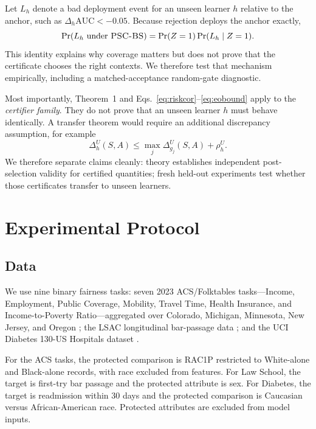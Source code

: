 \documentclass[10pt]{article}
\newcommand{\PSC}{\textsc{PSC-BS}}
\newcommand{\AUC}{\mathrm{AUC}}
\begin{document}
Let $L_h$ denote a bad deployment event for an unseen learner $h$ relative to the anchor, such as $\Delta_h\AUC<-0.05$.
Because rejection deploys the anchor exactly,
\begin{equation}
\Pr(L_h\text{ under }\PSC{})
=
\Pr(Z=1)\Pr(L_h\mid Z=1).
\label{eq:fallbackdecomp}
\end{equation}
This identity explains why coverage matters but does not prove that the certificate chooses the right contexts.
We therefore test that mechanism empirically, including a matched-acceptance random-gate diagnostic.

Most importantly, Theorem~1 and Eqs.~\eqref{eq:riskcor}--\eqref{eq:eobound} apply to the \emph{certifier family}.
They do not prove that an unseen learner $h$ must behave identically.
A transfer theorem would require an additional discrepancy assumption, for example
\begin{equation}
\Delta_h^U(S,A)
\le
\max_j \Delta_{g_j}^U(S,A)+\rho_h^U.
\end{equation}
We therefore separate claims cleanly: theory establishes independent post-selection validity for certified quantities; fresh held-out experiments test whether those certificates transfer to unseen learners.

\section{Experimental Protocol}

\subsection{Data}

We use nine binary fairness tasks:
seven 2023 ACS/Folktables tasks---Income, Employment, Public Coverage, Mobility, Travel Time, Health Insurance, and Income-to-Poverty Ratio---aggregated over Colorado, Michigan, Minnesota, New Jersey, and Oregon \citep{ding2021retiring};
the LSAC longitudinal bar-passage data \citep{wightman1998lsac};
and the UCI Diabetes 130-US Hospitals dataset \citep{clore2014diabetes,strack2014hba1c}.

For the ACS tasks, the protected comparison is RAC1P restricted to White-alone and Black-alone records, with race excluded from features.
For Law School, the target is first-try bar passage and the protected attribute is sex.
For Diabetes, the target is readmission within 30 days and the protected comparison is Caucasian versus African-American race.
Protected attributes are excluded from model inputs.
\end{document}
